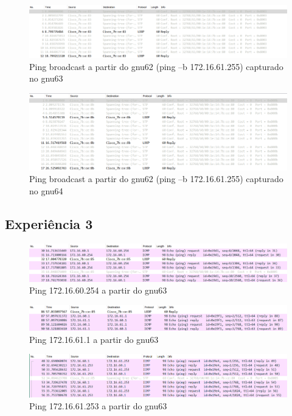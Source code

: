 \documentclass[article, a4paper, 11pt, oneside]{memoir}
\begin{document}
\begin{figure}[h]
	\centering
\includegraphics[scale=0.55]{exp2-step10-broadcast-gnu62-from-gnu63.png}
\caption{Ping broadcast a partir do gnu62 (ping –b 172.16.61.255) capturado no gnu63}
\end{figure}

\begin{figure}[h]
	\centering
\includegraphics[scale=0.55]{exp2-step10-broadcast-gnu62-from-gnu64.png}
\caption{Ping broadcast a partir do gnu62 (ping –b 172.16.61.255) capturado no gnu64}
\end{figure}

\newpage
\subsection{Experiência 3}
\begin{figure}[h]
	\centering
\includegraphics[scale=0.55]{exp3-step6-ping-60.254-from-gnu63.png}
\caption{Ping 172.16.60.254 a partir do gnu63}
\end{figure}

\begin{figure}[h]
	\centering
\includegraphics[scale=0.55]{exp3-step6-ping-61.1-from-gnu63.png}
\caption{Ping 172.16.61.1 a partir do gnu63}
\end{figure}

\begin{figure}[h]
	\centering
\includegraphics[scale=0.55]{exp3-step6-ping-61.253-from-gnu63.png}
\caption{Ping 172.16.61.253 a partir do gnu63}
\end{figure}
\end{document}

